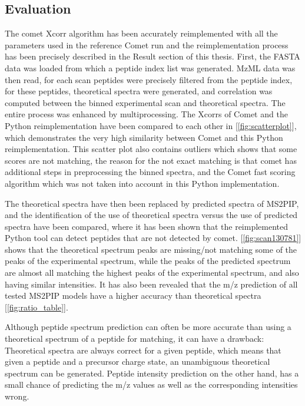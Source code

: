 \documentclass[11pt]{article}
\begin{document}
\subsection{Evaluation}
The comet Xcorr algorithm has been accurately reimplemented with all the parameters used in the reference Comet run and the reimplementation process has been precisely described in the Result section of this thesis. First, the FASTA data was loaded from which a peptide index list was generated. MzML data was then read, for each scan peptides were precisely filtered from the peptide index, for these peptides, theoretical spectra were generated, and correlation was computed between the binned experimental scan and theoretical spectra. The entire process was enhanced by multiprocessing. The Xcorrs of Comet and the Python reimplementation have been compared to each other in [\cref{fig:scatterplot}], which demonstrates the very high similarity between Comet and this Python reimplementation. This scatter plot also contains outliers which shows that some scores are not matching, the reason for the not exact matching is that comet has additional steps in preprocessing the binned spectra, and the Comet fast scoring algorithm which was not taken into account in this Python implementation. 

The theoretical spectra have then been replaced by predicted spectra of MS2PIP, and the identification of the use of theoretical spectra versus the use of predicted spectra have been compared, where it has been shown that the reimplemented Python tool can detect peptides that are not detected by comet. [\cref{fig:scan130781}] shows that the theoretical spectrum peaks are missing/not matching some of the peaks of the experimental spectrum, while the peaks of the predicted spectrum are almost all matching the highest peaks of the experimental spectrum, and also having similar intensities. It has also been revealed that the m/z prediction of all tested MS2PIP models have a higher accuracy than theoretical spectra [\cref{fig:ratio_table}]. 

Although peptide spectrum prediction can often be more accurate than using a theoretical spectrum of a peptide for matching,
it can have a drawback: Theoretical spectra are always correct for a given peptide, which means that given a peptide and a precursor charge state, an unambiguous theoretical spectrum can be generated. Peptide intensity prediction on the other hand, has a small chance of predicting the m/z values as well as the corresponding intensities wrong.
\end{document}

